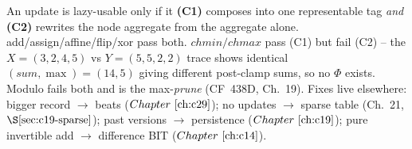 \begin{recallbox}
An update is lazy-usable only if it \textbf{(C1)} composes into one representable tag \emph{and} \textbf{(C2)} rewrites the node aggregate from the aggregate alone.  add/assign/affine/flip/xor pass both.  \(\mathit{chmin}/\mathit{chmax}\) pass (C1) but fail (C2) -- the \(X=(3,2,4,5)\) vs \(Y=(5,5,2,2)\) trace shows identical \((\mathit{sum},\max)=(14,5)\) giving different post-clamp sums, so no \(\Phi\) exists.  Modulo fails both and is the max-\emph{prune} (CF~438D, Ch.~19).  Fixes live elsewhere: bigger record \(\to\) beats (\(\chref{c29}\)); no updates \(\to\) sparse table (Ch.~21, \(\secref{c19-sparse}\)); past versions \(\to\) persistence (\(\chref{c19}\)); pure invertible add \(\to\) difference BIT (\(\chref{c14}\)).
\end{recallbox}
